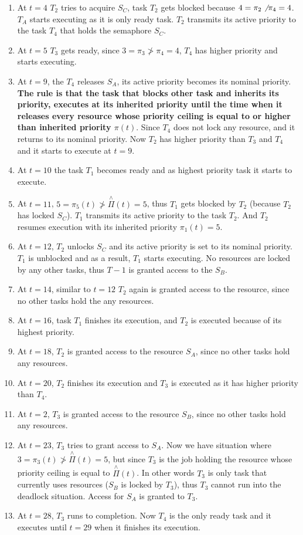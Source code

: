 \documentclass[10pt,a4paper]{article}
\begin{document}
\begin{enumerate}
    \item At $t=4$ $T_2$ tries to acquire $S_C$, task $T_2$ gets blocked because $4=\pi_2\not\>\pi_4=4$. $T_A$ starts executing as it is only ready task. $T_2$ transmits its active priority to the task $T_4$ that holds the semaphore $S_C$.
    \item At $t=5$ $T_3$ gets ready, since $3=\pi_3\not>\pi_4=4$, $T_4$ has higher priority and starts executing.
    \item At $t=9$, the $T_4$ releases $S_A$, its active priority becomes its nominal priority.\textbf{
    The rule is that 
    the task that blocks other task and inherits its priority, executes at its inherited priority until the time when it releases every resource whose priority ceiling is equal to or higher than inherited priority $\pi(t)$}.
    Since $T_4$ does not lock any resource, and it returns to its nominal priority. Now $T_2$ has higher priority than $T_3$ and $T_4$ and it starts to execute at $t=9$.
    \item At $t=10$ the task $T_1$ becomes ready and as highest priority task it starts to execute.
    \item At $t=11$,  $5=\pi_5(t)\not>\overset{\mathrm{\wedge}}{\Pi}(t)=5$, thus $T_1$ gets blocked by $T_2$ (because $T_2$ has locked $S_C$). $T_1$ transmits its active priority to the task $T_2$. And $T_2$ resumes execution with its inherited priority $\pi_1(t)=5$.
    \item At $t=12$, $T_2$ unlocks $S_C$ and its active priority is set to its nominal priority. $T_1$ is unblocked and as a result, $T_1$ starts executing. No resources are locked by any other tasks, thus $T-1$ is granted access to the $S_B$.
    \item At $t=14$, similar to $t=12$ $T_2$ again is granted access to the resource, since no other tasks hold the any resources.
    \item At $t=16$, task $T_1$ finishes its execution, and $T_2$ is executed because of its highest priority.
    \item At $t=18$,  $T_2$ is granted access to the resource $S_A$, since no other tasks hold any resources.
    \item At $t=20$, $T_2$ finishes its execution and $T_3$ is executed as it has higher priority than $T_4$.
    \item At $t=2$,  $T_3$ is granted access to the resource $S_B$, since no other tasks hold any resources.
    \item At $t=23$, $T_3$ tries to grant access to $S_A$. Now we have situation where $3=\pi_3(t)\not>\overset{\mathrm{\wedge}}{\Pi}(t)=5$, but since $T_3$ is the job holding the resource whose priority ceiling is equal to $\overset{\mathrm{\wedge}}{\Pi}(t)$. In other words $T_3$ is only task that currently uses resources ($S_B$ is locked by $T_3$), thus $T_3$ cannot run into the deadlock situation. Access for $S_A$ is granted to $T_3$.
    \item At $t=28$, $T_3$ runs to completion. Now $T_4$ is the only ready task and it executes until $t=29$ when it finishes its execution. 
\end{enumerate}
\end{document}
